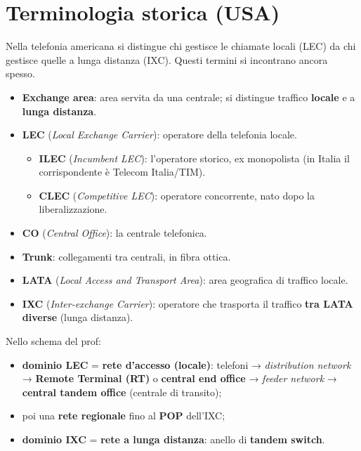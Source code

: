 \section{Terminologia storica (USA)}

\begin{inbreve}

Nella telefonia americana si distingue chi gestisce le chiamate locali (LEC) da chi gestisce quelle a lunga distanza (IXC). Questi termini si incontrano ancora spesso.

\end{inbreve}

\begin{itemize}
\tightlist
\item
  \textbf{Exchange area}: area servita da una centrale; si distingue traffico \textbf{locale} e a \textbf{lunga distanza}.
\item
  \textbf{LEC} (\emph{Local Exchange Carrier}): operatore della telefonia locale.

  \begin{itemize}
  \tightlist
  \item
    \textbf{ILEC} (\emph{Incumbent LEC}): l'operatore storico, ex monopolista (in Italia il corrispondente è Telecom Italia/TIM).
  \item
    \textbf{CLEC} (\emph{Competitive LEC}): operatore concorrente, nato dopo la liberalizzazione.
  \end{itemize}
\item
  \textbf{CO} (\emph{Central Office}): la centrale telefonica.
\item
  \textbf{Trunk}: collegamenti tra centrali, in fibra ottica.
\item
  \textbf{LATA} (\emph{Local Access and Transport Area}): area geografica di traffico locale.
\item
  \textbf{IXC} (\emph{Inter-exchange Carrier}): operatore che trasporta il traffico \textbf{tra LATA diverse} (lunga distanza).
\end{itemize}

Nello schema del prof:

\begin{itemize}
\tightlist
\item
  \textbf{dominio LEC} = \textbf{rete d'accesso (locale)}: telefoni → \emph{distribution network} → \textbf{Remote Terminal (RT)} o \textbf{central end office} → \emph{feeder network} → \textbf{central tandem office} (centrale di transito);
\item
  poi una \textbf{rete regionale} fino al \textbf{POP} dell'IXC;
\item
  \textbf{dominio IXC} = \textbf{rete a lunga distanza}: anello di \textbf{tandem switch}.
\end{itemize}

